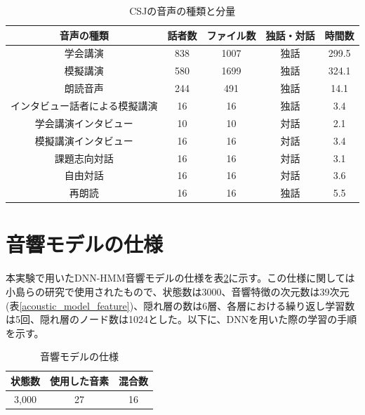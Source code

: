 \begin{table}[H]
  \begin{center}
    \caption{CSJの音声の種類と分量 \label{table:detail_csj}}
    \begin{tabular}{|c||c|c|c|c|} \hline
      音声の種類 & 話者数 & ファイル数 & 独話・対話 & 時間数\\ \hline
      学会講演 & 838 & 1007 & 独話 & 299.5 \\ \hline
      模擬講演 & 580 & 1699 & 独話 & 324.1 \\ \hline
      朗読音声 & 244 & 491 & 独話 & 14.1 \\ \hline
      インタビュー話者による模擬講演 & 16 & 16 & 独話 & 3.4 \\ \hline
      学会講演インタビュー & 10 & 10 & 対話 & 2.1 \\ \hline
      模擬講演インタビュー & 16 & 16 & 対話 & 3.4 \\ \hline
      課題志向対話 & 16 & 16 & 対話 & 3.1 \\ \hline
      自由対話 & 16 & 16 & 対話 & 3.6 \\ \hline
      再朗読 & 16 & 16 & 独話 & 5.5\\ \hline
    \end{tabular}
  \end{center}
\end{table}

\section{音響モデルの仕様}
\label{section:experiment_acoustic_model}
本実験で用いたDNN-HMM音響モデルの仕様を表\ref{table:acoustic_model_detail}に示す。この仕様に関しては小島らの研究\cite{kojima}で使用されたもので、状態数は3000、音響特徴の次元数は39次元(表\ref{acoustic_model_feature})、隠れ層の数は6層、各層における繰り返し学習数は5回、隠れ層のノード数は1024とした。以下に、DNNを用いた際の学習の手順を示す。

\begin{table}[H]
  \begin{center}
    \caption{音響モデルの仕様 \label{table:acoustic_model_detail}}
    \begin{tabular}{|c|c|c|} \hline
     状態数  & 使用した音素 & 混合数 \\ \hline
     3,000  & 27 & 16 \\ \hline
    \end{tabular}
  \end{center}
\end{table}

